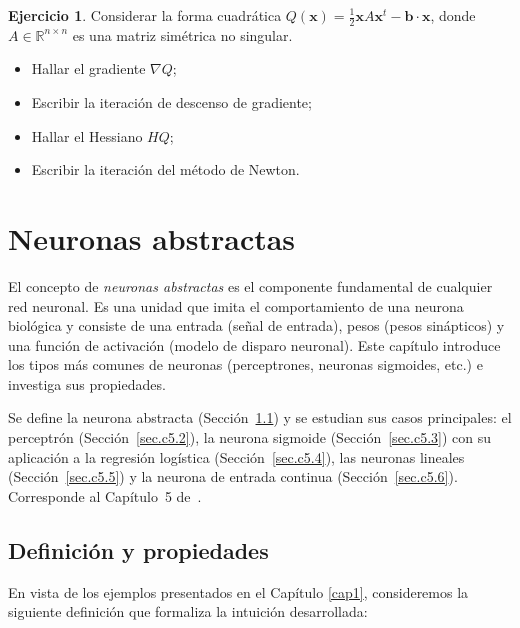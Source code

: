\documentclass[12pt, a4paper]{amsbook}
\newcommand{\R}{{\mathbb R}}
\newcommand{\xx}{{\mathbf x}}
\newcommand{\bb}{{\mathbf b}}
\theoremstyle{remark}
\theoremstyle{definition}
\newtheorem{ejer}[teo]{Ejercicio}
\numberwithin{section}{chapter}
\numberwithin{subsection}{section}
\numberwithin{equation}{section}
\numberwithin{figure}{chapter}
\begin{document}
\begin{ejer}
Considerar la forma cuadrática $Q(\xx) = \frac12 \xx A \xx^t - \bb\cdot\xx$, donde $A\in\R^{n\times n}$ es una matriz simétrica no singular.
\begin{itemize}
\item[(a)] Hallar el gradiente $\nabla Q$;

\item[(b)] Escribir la iteración de descenso de gradiente;

\item[(c)] Hallar el Hessiano $HQ$;

\item[(d)] Escribir la iteración del método de Newton.
\end{itemize} 
\end{ejer}



\chapter{Neuronas abstractas}\label{cap5}

El concepto de {\em neuronas abstractas} es el componente fundamental de cualquier red neuronal. Es una unidad que imita el comportamiento de una neurona biológica y consiste de una entrada (señal de entrada), pesos (pesos sinápticos) y una función de activación (modelo de disparo neuronal). Este capítulo introduce los tipos más comunes de neuronas (perceptrones, neuronas sigmoides, etc.) e investiga sus propiedades.

Se define la neurona abstracta (Sección~\ref{sec.c5.1}) y se estudian sus casos principales: el perceptrón (Sección~\ref{sec.c5.2}), la neurona sigmoide (Sección~\ref{sec.c5.3}) con su aplicación a la regresión logística (Sección~\ref{sec.c5.4}), las neuronas lineales (Sección~\ref{sec.c5.5}) y la neurona de entrada continua (Sección~\ref{sec.c5.6}). Corresponde al Capítulo~5 de~\cite{Calin}.

\section{Definición y propiedades}\label{sec.c5.1}

En vista de los ejemplos presentados en el Capítulo \ref{cap1}, consideremos la siguiente definición que formaliza la intuición desarrollada:
\end{document}
